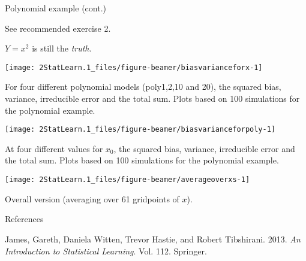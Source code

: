 \documentclass[ignorenonframetext,]{beamer}
\begin{document}
\begin{frame}

\begin{block}{Polynomial example (cont.)}

See recommended exercise 2.

\vspace{2mm}

\(Y=x^2\) is still the \emph{truth}.

\vspace{2mm}

\begin{center}\texttt{[image: 2StatLearn.1\_files/figure-beamer/biasvarianceforx-1]} \end{center}

For four different polynomial models (poly1,2,10 and 20), the squared
bias, variance, irreducible error and the total sum. Plots based on 100
simulations for the polynomial example.

\end{block}

\end{frame}

\begin{frame}

\begin{center}\texttt{[image: 2StatLearn.1\_files/figure-beamer/biasvarianceforpoly-1]} \end{center}

At four different values for \(x_0\), the squared bias, variance,
irreducible error and the total sum. Plots based on 100 simulations for
the polynomial example.

\end{frame}

\begin{frame}

\begin{center}\texttt{[image: 2StatLearn.1\_files/figure-beamer/averageoverxs-1]} \end{center}

Overall version (averaging over 61 gridpoints of \(x\)).

\end{frame}

\begin{frame}{References}
\protect\hypertarget{references}{}

\hypertarget{refs}{}
\leavevmode\hypertarget{ref-ISL}{}%
James, Gareth, Daniela Witten, Trevor Hastie, and Robert Tibshirani.
2013. \emph{An Introduction to Statistical Learning}. Vol. 112.
Springer.

\end{frame}
\end{document}
